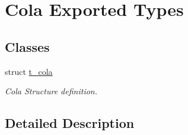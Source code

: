 \hypertarget{group___cola___exported___types}{}\section{Cola Exported Types}
\label{group___cola___exported___types}
\subsection*{Classes}
\begin{DoxyCompactItemize}
\item 
struct \hyperlink{structt__cola}{t\+\_\+cola}
\begin{DoxyCompactList}\small\item\em Cola Structure definition. \end{DoxyCompactList}\end{DoxyCompactItemize}


\subsection{Detailed Description}
